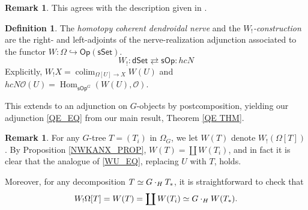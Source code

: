 \documentclass[a4paper,10pt
,draft
]{article}%
\numberwithin{equation}{section}
\numberwithin{figure}{section}
\theoremstyle{definition} %
\newtheorem{definition}[equation]{Definition}%
\newtheorem{remark}[equation]{Remark}%
\newcommand{\into}{\hookrightarrow}%
\newcommand{\sSet}{\ensuremath{\mathsf{sSet}}}%
\newcommand{\Op}{\mathsf{Op}}%
\newcommand{\sOp}{\ensuremath{\mathsf{sOp}}}%
\newcommand{\dSet}{\mathsf{dSet}}
\DeclareMathOperator{\colim}{colim}%
\DeclareMathOperator{\Hom}{Hom}%
\renewcommand{\O}{\ensuremath{\mathcal O}}
\newcommand{\1}{\ensuremath{\mathbbm 1}}%
\begin{document}
\begin{remark}
      This agrees with the description given in \cite[\S 4]{CM13b}.
\end{remark}


\begin{definition}
      The \textit{homotopy coherent dendroidal nerve} and the \textit{$W_!$-construction}
      are the right- and left-adjoints of the nerve-realization adjunction associated to the functor $W: \Omega \into \Op(\sSet)$.
      \begin{equation}
            \label{SOPDSET_EQ}
            W_! \colon \dSet \rightleftarrows \sOp \colon h c N           
      \end{equation}
      Explicitly, $W_!X = \colim_{\Omega[U] \to X}W(U)$ and $hcN\O(U) = \Hom_{\sOp^G}(W(U), \O)$.

      This extends to an adjunction on $G$-objects by postcomposition, yielding our adjunction \eqref{QE_EQ} from our main result,
      Theorem \ref{QE THM}.
\end{definition}

\begin{remark}
      For any $G$-tree $T = (T_i)$ in $\Omega_G$, we let $W(T)$ denote $W_!(\Omega[T])$.
      By Proposition \ref{NWKANX_PROP},
      $W(T) = \coprod W(T_i)$,
      and in fact it is clear that the analogue of \eqref{WU_EQ}, replacing $U$ with $T$, holds.
      
      {\color{OliveGreen} %
        Moreover, for any decomposition $T \simeq G \cdot_H T_{\**}$, it is straightforward to check that
        \[
              W_!\Omega[T] = W(T) = \coprod W(T_i) \simeq G \cdot_H W(T_{\**}).
        \]
      }
\end{remark}
\end{document}
